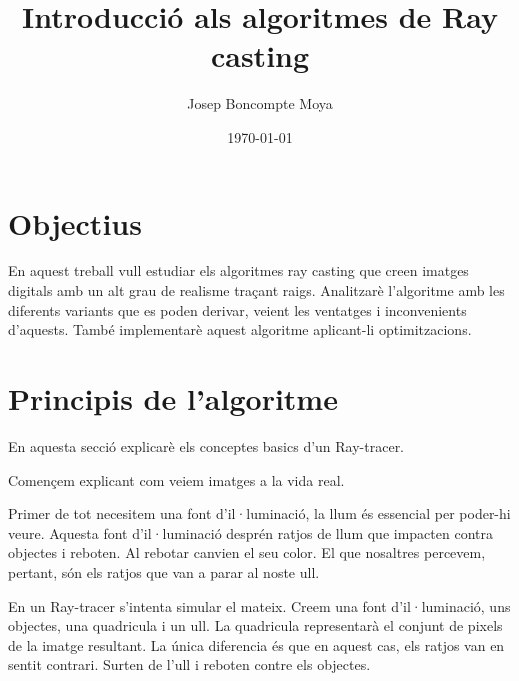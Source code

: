 \documentclass{article}
\title{Introducció als algoritmes de Ray casting}
\author{Josep Boncompte Moya}
\date{\today}
\begin{document}
\maketitle

\section{Objectius}
En aquest treball vull estudiar els algoritmes ray casting que creen imatges digitals amb un alt grau de realisme traçant raigs.
Analitzarè l'algoritme amb les diferents variants que es poden derivar, veient les ventatges i inconvenients d'aquests. 
També implementarè aquest algoritme aplicant-li optimitzacions.

\section{Principis de l'algoritme}
En aquesta secció explicarè els conceptes basics d'un Ray-tracer.

Començem explicant com veiem imatges a la vida real. 

Primer de tot necesitem una font d'il·luminació, la llum és essencial per
poder-hi veure. Aquesta font d'il·luminació desprén ratjos de llum que impacten contra objectes i reboten. Al rebotar canvien el
seu color. El que nosaltres percevem, pertant, són els ratjos que van a parar al noste ull.

En un Ray-tracer s'intenta simular el mateix. Creem una font d'il·luminació, uns objectes, una quadricula i un ull. 
La quadricula representarà el conjunt de pixels de la imatge resultant.
La única diferencia és que en
aquest cas, els ratjos van en sentit contrari. Surten de l'ull i reboten contre els objectes.
\end{document}
